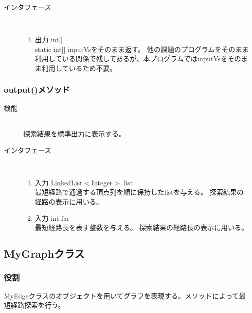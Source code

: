 \documentclass[a4j]{jarticle}
\begin{document}
\begin{description}
\begin{description}
\begin{description}
\item[インタフェース]\
  \begin{enumerate}
  \item 出力 int[]\mbox{}\\
    static int[] inputVsをそのまま返す。
    他の課題のプログラムをそのまま利用している関係で残してあるが、本プログラムではinputVsをそのまま利用しているため不要。 
  \end{enumerate}
\end{description}

\subsubsection{output()メソッド}

\begin{description}
\item[機能]\mbox{}\\
探索結果を標準出力に表示する。
\item[インタフェース]\
  \begin{enumerate}
  \item 入力 LinkedList$<$Integer$>$ list\mbox{}\\
    最短経路で通過する頂点列を順に保持したlistを与える。
    探索結果の経路の表示に用いる。
  \item 入力 int far\mbox{}\\
    最短経路長を表す整数を与える。
    探索結果の経路長の表示に用いる。
  \end{enumerate}
\end{description}

\subsection{MyGraphクラス}

\subsubsection{役割}
MyEdgeクラスのオブジェクトを用いてグラフを表現する。メソッドによって最短経路探索を行う。


\end{description}
\end{description}
\end{document}
